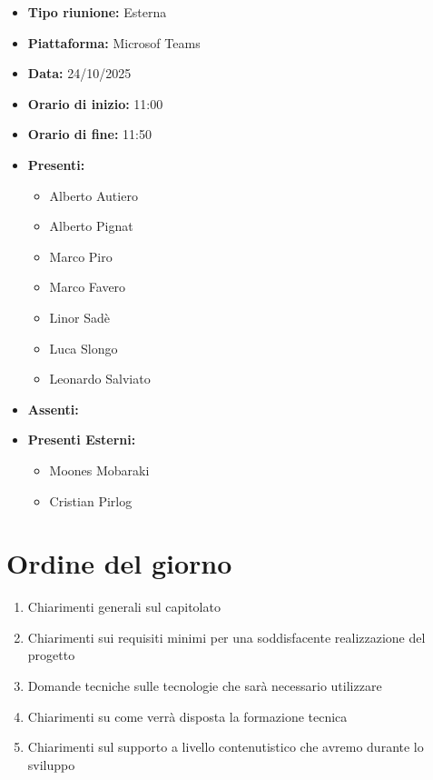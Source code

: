 \documentclass[a4paper,12pt]{article}
\begin{document}
\begin{itemize}
    \item \textbf{Tipo riunione:} Esterna
    \item \textbf{Piattaforma:} Microsof Teams
    \item \textbf{Data:} 24/10/2025
    \item \textbf{Orario di inizio:} 11:00
    \item \textbf{Orario di fine:} 11:50
    \item \textbf{Presenti:}
    \begin{itemize}[leftmargin=1.5em, itemsep=3pt, label={\rule[0.5ex]{0.4em}{0.4em}}]
        \item Alberto Autiero
        \item Alberto Pignat
        \item Marco Piro
        \item Marco Favero
        \item Linor Sadè
        \item Luca Slongo
        \item Leonardo Salviato
    \end{itemize}
    \item \textbf{Assenti:}
    \item \textbf{Presenti Esterni:}
    \begin{itemize}[leftmargin=1.5em, itemsep=3pt, label={\rule[0.5ex]{0.4em}{0.4em}}]
        \item Moones Mobaraki
        \item Cristian Pirlog
    \end{itemize}

\end{itemize}

\section{Ordine del giorno}

\begin{enumerate}
    \item Chiarimenti generali sul capitolato
    \item Chiarimenti sui requisiti minimi per una soddisfacente realizzazione del progetto
    \item Domande tecniche sulle tecnologie che sarà necessario utilizzare
    \item Chiarimenti su come verrà disposta la formazione tecnica
    \item Chiarimenti sul supporto a livello contenutistico che avremo durante lo sviluppo
\end{enumerate}
\end{document}
